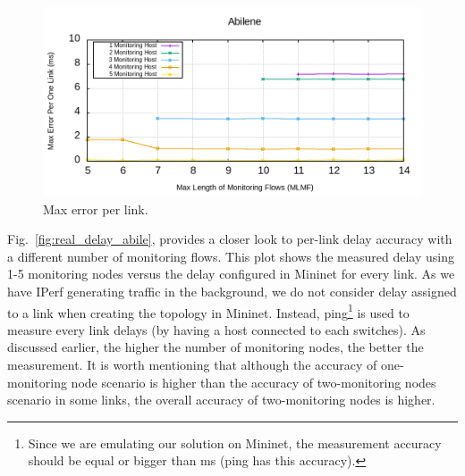 \documentclass[10pt, journal, letterpaper]{IEEEtran}
\begin{document}
\begin{figure}
    \centering
    \includegraphics[width=.8\columnwidth]{img/eval_Abilene_Max_Length_of_Max_error_per_one_link.png}
    \caption{Max error per link.}
    \label{fig:max_error_abilen}
\end{figure}
Fig.~\ref{fig:real_delay_abile}, provides a closer look to per-link delay accuracy with a different number of monitoring flows. This plot shows the measured delay using 1-5 monitoring nodes versus the delay configured in Mininet for every link. As we have IPerf generating traffic in the background, we do not consider delay assigned to a link when creating the topology in Mininet. Instead, ping\footnote{Since we are emulating our solution on Mininet, the measurement accuracy should be equal or bigger than ms (ping has this accuracy).} is used to measure every link delays (by having a host connected to each switches). As discussed earlier, the higher the number of monitoring nodes, the better the measurement. It is worth mentioning that although the accuracy of one-monitoring node scenario is higher than the accuracy of two-monitoring nodes scenario in some links, the overall accuracy of two-monitoring nodes is higher. 
\end{document}

